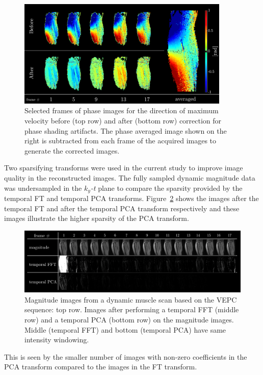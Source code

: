 \begin{figure}[!htb]
\vspace{+0.2cm}
\centering
\includegraphics[width=0.9\textwidth]{Figures/CS1_6.pdf}
\caption[Selected frames of phase images for the direction of maximum velocity before and after correction for phase shading artifacts]{Selected frames of phase images for the direction of maximum velocity before (top row) and after (bottom row) correction for phase shading artifacts. The phase averaged image shown on the right is subtracted from each frame of the acquired images to generate the corrected images.}
\label{fig: CSS4}
\end{figure}
Two sparsifying transforms were used in the current study to improve image quality in the reconstructed images. 
The fully sampled dynamic magnitude data was undersampled in the $k_y$\textit{-t} plane to compare the sparsity provided by the temporal FT and temporal PCA transforms. 
Figure~\ref{fig: CS4} shows the images after the temporal FT and after the temporal PCA transform respectively and these images illustrate the higher sparsity of the PCA transform.
\begin{figure}
\vspace{+0.2cm}
\centering
\includegraphics[width=8.5in]{Figures/CS1_7.pdf}
\captionsetup{width=8.5in}
\caption[Magnitude images and images after performing a temporal FFT and a temporal PCA transformations]{Magnitude images from a dynamic muscle scan based on the VEPC sequence: top row. Images after performing a temporal FFT (middle row) and a temporal PCA (bottom row) on the magnitude images. Middle (temporal FFT) and bottom (temporal PCA) have same intensity windowing.}
\label{fig: CS4}
\end{figure}
This is seen by the smaller number of images with non-zero coefficients in the PCA transform compared to the images in the FT transform. 

